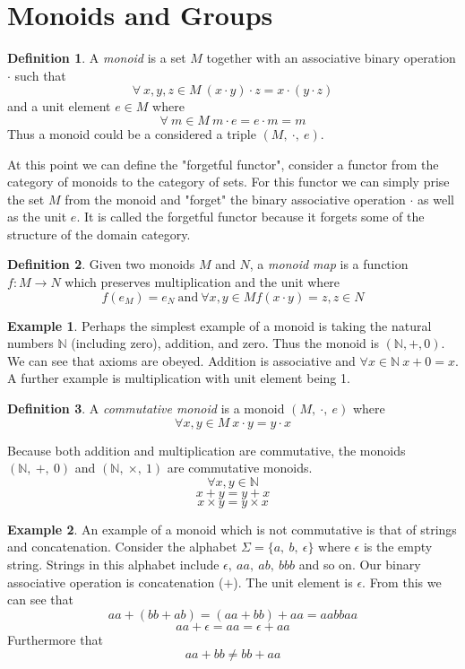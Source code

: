 \documentclass{article}
\theoremstyle{definition}
\newtheorem{definition}{Definition}[section]
\newtheorem{example}{Example}[section]
\begin{document}
\section{Monoids and Groups}

\begin{definition}
    A \textit{monoid} is a set $M$ together with an associative binary operation $\cdot$ such that
    $$\forall\ x, y, z \in M\ (x \cdot y) \cdot z = x \cdot (y \cdot z)$$
    and a unit element $e \in M$ where
    $$\forall\ m \in M\ m \cdot e = e \cdot m = m$$
    Thus a monoid could be a considered a triple $(M,\ \cdot,\ e)$.
\end{definition}

At this point we can define the "forgetful functor", consider a functor from the
category of monoids to the category of sets. For this functor we can simply prise the
set $M$ from the monoid and "forget" the binary associative operation $\cdot$ as well as
the unit $e$. It is called the forgetful functor because it forgets some of the structure of
the domain category.

\begin{definition}
    Given two monoids $M$ and $N$, a \textit{monoid map} is a function $f : M \rightarrow N$
    which preserves multiplication and the unit where
    $$f(e_M) = e_N\ \textrm{and}\ \forall x, y \in M f(x \cdot y) = z, z \in N$$
\end{definition}

\begin{example}
    Perhaps the simplest example of a monoid is taking the natural numbers $\mathbb{N}$
    (including zero), addition, and zero.
    Thus the monoid is $(\mathbb{N}, +, 0)$. We can see that axioms
    are obeyed. Addition is associative and $\forall x \in \mathbb{N}\ x + 0 = x$.
    A further example is multiplication with unit element being 1.
\end{example}

\begin{definition}
    A \textit{commutative monoid} is a monoid $(M,\ \cdot,\ e)$ where
    $$\forall x, y \in M\ x \cdot y = y \cdot x$$
\end{definition}

Because both addition and multiplication are commutative, the monoids $(\mathbb{N},\ +,\ 0)$
and $(\mathbb{N},\ \times,\ 1)$ are commutative monoids.
$$ \forall x, y \in \mathbb{N}$$
$$x + y = y + x$$
$$x \times y = y \times x$$

\begin{example}
    An example of a monoid which is not commutative is that of strings and concatenation.
    Consider the alphabet $\Sigma = \{a,\ b,\ \epsilon\}$ where $\epsilon$ is the empty string.
    Strings in this alphabet include $\epsilon,\ aa,\ ab,\ bbb$ and so on.
    Our binary associative operation is concatenation ($+$).
    The unit element is $\epsilon$.
    From this we can see that
    $$aa + (bb + ab) = (aa + bb) + aa = aabbaa$$
    $$aa + \epsilon = aa = \epsilon + aa$$
    Furthermore that
    $$aa + bb \ne bb + aa$$
\end{example}
\end{document}
